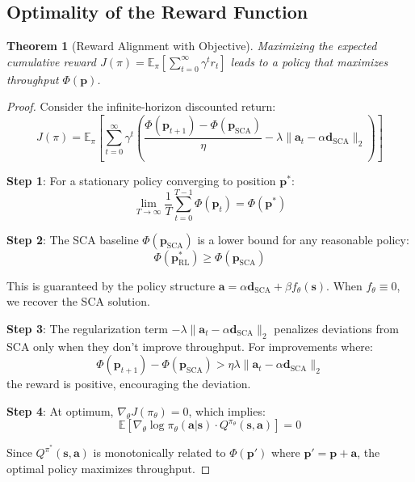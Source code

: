 \documentclass[11pt,a4paper]{article}
\newtheorem{theorem}{Theorem}[section]
\newcommand{\E}{\mathbb{E}}
\newcommand{\bs}{\mathbf{s}}
\newcommand{\ba}{\mathbf{a}}
\newcommand{\bp}{\mathbf{p}}
\newcommand{\dsca}{\mathbf{d}_{\text{SCA}}}
\newcommand{\psca}{\mathbf{p}_{\text{SCA}}}
\newcommand{\popt}{\mathbf{p}^*}
\begin{document}
\subsection{Optimality of the Reward Function}

\begin{theorem}[Reward Alignment with Objective]
\label{thm:alignment}
Maximizing the expected cumulative reward $J(\pi) = \E_\pi\left[\sum_{t=0}^{\infty} \gamma^t r_t\right]$ leads to a policy that maximizes throughput $\Phi(\bp)$.
\end{theorem}

\begin{proof}
Consider the infinite-horizon discounted return:
\begin{equation}
    J(\pi) = \E_\pi\left[\sum_{t=0}^{\infty} \gamma^t \left(\frac{\Phi(\bp_{t+1}) - \Phi(\psca)}{\eta} - \lambda\|\ba_t - \alpha\dsca\|_2\right)\right]
\end{equation}

\textbf{Step 1}: For a stationary policy converging to position $\popt$:
\begin{equation}
    \lim_{T\to\infty} \frac{1}{T}\sum_{t=0}^{T-1} \Phi(\bp_t) = \Phi(\popt)
\end{equation}

\textbf{Step 2}: The SCA baseline $\Phi(\psca)$ is a lower bound for any reasonable policy:
\begin{equation}
    \Phi(\bp^*_{\text{RL}}) \geq \Phi(\psca)
\end{equation}

This is guaranteed by the policy structure $\ba = \alpha\dsca + \beta f_\theta(\bs)$. When $f_\theta \equiv 0$, we recover the SCA solution.

\textbf{Step 3}: The regularization term $-\lambda\|\ba_t - \alpha\dsca\|_2$ penalizes deviations from SCA only when they don't improve throughput. For improvements where:
\begin{equation}
    \Phi(\bp_{t+1}) - \Phi(\psca) > \eta\lambda\|\ba_t - \alpha\dsca\|_2
\end{equation}
the reward is positive, encouraging the deviation.

\textbf{Step 4}: At optimum, $\nabla_\theta J(\pi_\theta) = 0$, which implies:
\begin{equation}
    \E\left[\nabla_\theta \log\pi_\theta(\ba|\bs) \cdot Q^{\pi_\theta}(\bs, \ba)\right] = 0
\end{equation}

Since $Q^{\pi^*}(\bs, \ba)$ is monotonically related to $\Phi(\bp')$ where $\bp' = \bp + \ba$, the optimal policy maximizes throughput.
\end{proof}
\end{document}
